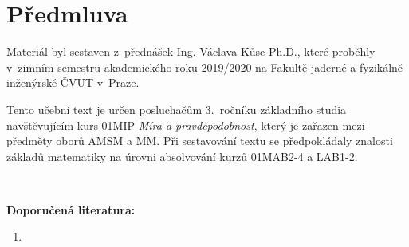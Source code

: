 \chapter*{Předmluva}

Materiál byl sestaven z~přednášek Ing. Václava Kůse Ph.D., které proběhly v~zimním semestru akademického roku 2019/2020 na Fakultě jaderné a 
fyzikálně inženýrské ČVUT v~Praze.

Tento učební text je určen posluchačům 3.~ročníku základního studia navštěvujícím kurs 01MIP \emph{Míra a pravděpodobnost}, který je zařazen 
mezi předměty oborů AMSM a MM. Při sestavování textu se předpokládaly znalosti základů matematiky na úrovni absolvování kurzů 01MAB2-4 a LAB1-2.

~

\textbf{Doporučená literatura:}
\begin{enumerate}[(1)]
  \item 
  
\end{enumerate}
 
